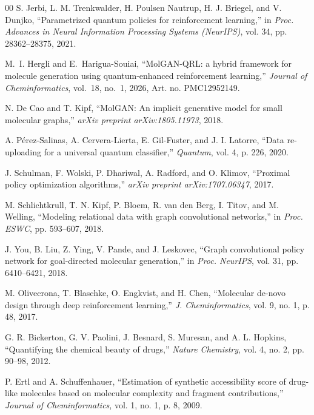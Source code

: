 \documentclass[conference]{IEEEtran}
\begin{document}
\begin{thebibliography}{00}
 S. Jerbi, L. M. Trenkwalder, H. Poulsen Nautrup, H. J. Briegel, and V. Dunjko, ``Parametrized quantum policies for reinforcement learning,'' in \textit{Proc. Advances in Neural Information Processing Systems (NeurIPS)}, vol. 34, pp. 28362--28375, 2021.

 M.~I. Hergli and E.~Harigua-Souiai, ``MolGAN-QRL: a hybrid framework for molecule generation using quantum-enhanced reinforcement learning,'' \textit{Journal of Cheminformatics}, vol.~18, no.~1, 2026, Art. no. PMC12952149.

 N. De Cao and T. Kipf, ``MolGAN: An implicit generative model for small molecular graphs,'' \textit{arXiv preprint arXiv:1805.11973}, 2018.

 A. P{\'e}rez-Salinas, A. Cervera-Lierta, E. Gil-Fuster, and J. I. Latorre, ``Data re-uploading for a universal quantum classifier,'' \textit{Quantum}, vol. 4, p. 226, 2020.

 J. Schulman, F. Wolski, P. Dhariwal, A. Radford, and O. Klimov, ``Proximal policy optimization algorithms,'' \textit{arXiv preprint arXiv:1707.06347}, 2017.

 M. Schlichtkrull, T. N. Kipf, P. Bloem, R. van den Berg, I. Titov, and M. Welling, ``Modeling relational data with graph convolutional networks,'' in \textit{Proc. ESWC}, pp. 593--607, 2018.

 J. You, B. Liu, Z. Ying, V. Pande, and J. Leskovec, ``Graph convolutional policy network for goal-directed molecular generation,'' in \textit{Proc. NeurIPS}, vol. 31, pp. 6410--6421, 2018.

 M. Olivecrona, T. Blaschke, O. Engkvist, and H. Chen, ``Molecular de-novo design through deep reinforcement learning,'' \textit{J. Cheminformatics}, vol. 9, no. 1, p. 48, 2017.

 G. R. Bickerton, G. V. Paolini, J. Besnard, S. Muresan, and A. L. Hopkins, ``Quantifying the chemical beauty of drugs,'' \textit{Nature Chemistry}, vol. 4, no. 2, pp. 90--98, 2012.

 P. Ertl and A. Schuffenhauer, ``Estimation of synthetic accessibility score of drug-like molecules based on molecular complexity and fragment contributions,'' \textit{Journal of Cheminformatics}, vol. 1, no. 1, p. 8, 2009.


\end{thebibliography}
\end{document}
